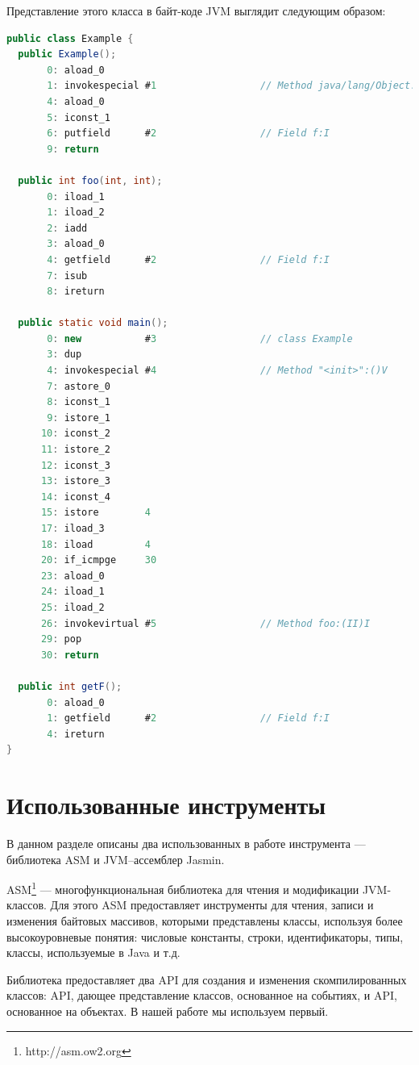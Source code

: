 Представление этого класса в байт-коде JVM выглядит следующим образом:

\begin{lstlisting}[language = Java]
public class Example {
  public Example();
       0: aload_0
       1: invokespecial #1                  // Method java/lang/Object."<init>":()V
       4: aload_0
       5: iconst_1
       6: putfield      #2                  // Field f:I
       9: return

  public int foo(int, int);
       0: iload_1
       1: iload_2
       2: iadd
       3: aload_0
       4: getfield      #2                  // Field f:I
       7: isub
       8: ireturn

  public static void main();
       0: new           #3                  // class Example
       3: dup
       4: invokespecial #4                  // Method "<init>":()V
       7: astore_0
       8: iconst_1
       9: istore_1
      10: iconst_2
      11: istore_2
      12: iconst_3
      13: istore_3
      14: iconst_4
      15: istore        4
      17: iload_3
      18: iload         4
      20: if_icmpge     30
      23: aload_0
      24: iload_1
      25: iload_2
      26: invokevirtual #5                  // Method foo:(II)I
      29: pop
      30: return

  public int getF();
       0: aload_0
       1: getfield      #2                  // Field f:I
       4: ireturn
}
\end{lstlisting}


\section{Использованные инструменты}

В данном разделе описаны два использованных в работе инструмента --- библиотека ASM и JVM--ассемблер Jasmin.

ASM\footnote{http://asm.ow2.org} --- многофункциональная библиотека для чтения и модификации JVM-классов. Для этого ASM предоставляет инструменты для чтения, записи и изменения байтовых массивов, которыми представлены классы, используя более высокоуровневые понятия: числовые константы, строки, идентификаторы, типы, классы, используемые в Java и т.д. 

Библиотека предоставляет два API для создания и изменения скомпилированных классов: API, дающее представление классов, основанное на событиях, и API, основанное на объектах. В нашей работе мы используем первый.

